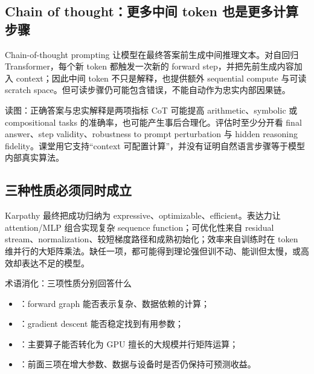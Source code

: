 \subsection{Chain of thought：更多中间 token 也是更多计算步骤}

Chain-of-thought prompting 让模型在最终答案前生成中间推理文本。对自回归 Transformer，每个新 token 都触发一次新的 forward step，并把先前生成内容加入 context；因此中间 token 不只是解释，也提供额外 sequential compute 与可读 scratch space。但可读步骤仍可能包含错误，不能自动作为忠实内部因果链。


\begin{warningbox}{读图：正确答案与忠实解释是两项指标}
CoT 可能提高 arithmetic、symbolic 或 compositional tasks 的准确率，也可能产生事后合理化。评估时至少分开看 final answer、step validity、robustness to prompt perturbation 与 hidden reasoning fidelity。课堂用它支持“context 可配置计算”，并没有证明自然语言步骤等于模型内部真实算法。
\end{warningbox}

\subsection{三种性质必须同时成立}

Karpathy 最终把成功归纳为 expressive、optimizable、efficient。表达力让 attention/MLP 组合实现复杂 sequence function；可优化性来自 residual stream、normalization、较短梯度路径和成熟初始化；效率来自训练时在 token 维并行的大矩阵乘法。缺任一项，都可能得到理论强但训不动、能训但太慢，或高效却表达不足的模型。


\begin{knowledgebox}{术语消化：三项性质分别回答什么}
\begin{itemize}
  \item {}：forward graph 能否表示复杂、数据依赖的计算；
  \item {}：gradient descent 能否稳定找到有用参数；
  \item {}：主要算子能否转化为 GPU 擅长的大规模并行矩阵运算；
  \item {}：前面三项在增大参数、数据与设备时是否仍保持可预测收益。
\end{itemize}
\end{knowledgebox}

